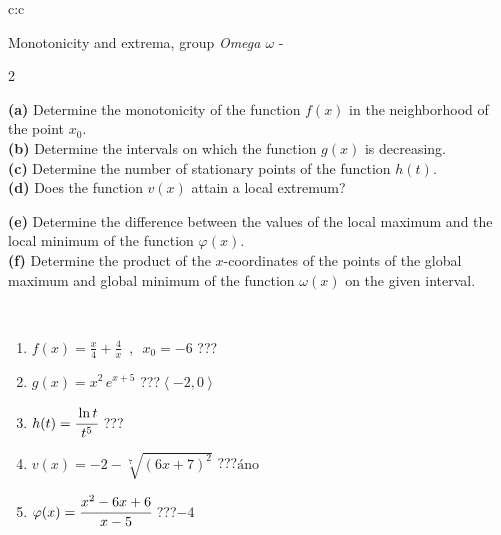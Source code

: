\documentclass[10pt]{report}
\begin{document}
\begin{tabular}{c:c}
\begin{minipage}[c][104.5mm][t]{0.5\linewidth}
\begin{center}
\vspace{5mm}
{\huge Monotonicity and extrema, group \textit{Omega $\omega$} -}\\[5mm]
\begin{minipage}{0.95\linewidth}
\begin{center}
{\small \begin{multicols}{2} \raggedright
\textbf{(a)} Determine the monotonicity of the function \(f(x)\) in the neighborhood of the point \(x_0\). \\[1mm]
\textbf{(b)} Determine the intervals on which the function \(g(x)\) is decreasing. \\[1mm]
\textbf{(c)} Determine the number of stationary points of the function \(h(t)\). \\[1mm]
\textbf{(d)} Does the function \(v(x)\) attain a local extremum? \par \columnbreak
\textbf{(e)} Determine the difference between the values of the local maximum and the local minimum of the function \(\varphi(x)\). \\[1mm]
\textbf{(f)} Determine the product of the \(x\)-coordinates of the points of the global maximum and global minimum of the function \(\omega(x)\) on the given interval. \\[1mm]
\end{multicols}
}
\end{center}
\end{minipage}
\\[1mm]
\begin{minipage}{0.79\linewidth}
\begin{center}
\begin{varwidth}{\linewidth}
\setlength{\itemsep}{0pt}
\begin{enumerate}
\normalsize
\item $f(x)=\frac{x}{4}+\frac{4}{x} \enspace , \enspace x_0=-6$\quad \dotfill\; ???\;\dotfill \quad {}
\item $g(x)=x^2\, e^{x+5}$\quad \dotfill\; ???\;\dotfill \quad $\left\langle-2 , 0\right\rangle$
\item $h(t)=\cfrac{\ln t}{t^5}$\quad \dotfill\; ???\;\dotfill {}
\item $v(x)=-2-\sqrt[7]{(6x+7)^2}$\quad \dotfill\; ???\;\dotfill \quad $\text{áno}$
\item $\varphi(x)=\cfrac{x^2-6x+6}{x-5}$\quad \dotfill\; ???\;\dotfill \quad $-4$

\end{enumerate}
\end{varwidth}
\end{center}
\end{minipage}
\end{center}
\end{minipage}
\end{tabular}
\end{document}
